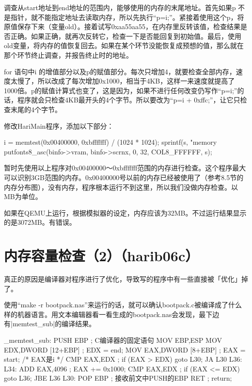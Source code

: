 调查从start地址到end地址的范围内，能够使用的内存的末尾地址。首先如果p 不是指针，就不能指定地址去读取内存，所以先执行“p=i;”。紧接着使用这个p，将原值保存下来（变量old）。接着试写0xaa55aa55，在内存里反转该值，检查结果是否正确。如果正确，就再次反转它，检查一下是否能回复到初始值。最后，使用old变量，将内存的值恢复回去。如果在某个环节没能恢复成预想的值，那么就在那个环节终止调查，并报告终止时的地址。

for 语句中i 的增值部分以及p的赋值部分。每次只增加4，就要检查全部内存，速度太慢了，所以改成了每次增加0x1000，相当于4KB，这样一来速度就提高了1000倍。p的赋值计算式也变了，这是因为，如果不进行任何改变仍写作“p=i;”的话，程序就会只检查4KB最开头的4个字节。所以要改为“p=i + 0xffc;”，让它只检查末尾的4个字节。


\cs

修改HariMain程序，添加以下部分：
\begin{code}[label=bootpack.c节选]
	i = memtest(0x00400000, 0xbfffffff) / (1024 * 1024);
	sprintf(s, "memory %
	putfonts8_asc(binfo->vram, binfo->scrnx, 0, 32, COL8_FFFFFF, s);
\end{code}

暂时先使用以上程序对0x00400000～0xbfffffff范围的内存进行检查。这个程序最大可以识别3GB范围的内存。0x00400000号以前的内存已经被使用了（参考8.5节的内存分布图），没有内存，程序根本运行不到这里，所以我们没做内存检查。以MB为单位。

如果在QEMU上运行，根据模拟器的设定，内存应该为32MB。不过运行结果显示的是3072MB。有错误。

\section{	内存容量检查（2）（harib06c）	}

真正的原因是编译器对程序进行了优化，导致写的程序中有一些直接被「优化」掉了。

使用“make -r bootpack.nas”来运行的话，就可以确认bootpack.c被编译成了什么样的机器语言。用文本编辑器看一看生成的bootpack.nas会发现，最下边有|memtest_sub|的编译结果。

\begin{code}[label=memtest\_sub的编译结果]
_memtest_sub:
    PUSH    EBP                 ; C编译器的固定语句
    MOV EBP,ESP
    MOV EDX,DWORD [12+EBP]      ; EDX = end;
    MOV EAX,DWORD [8+EBP]       ; EAX = start; /* EAX是i */
    CMP EAX,EDX                 ; if (EAX > EDX) goto L30;
    JA  L30
L36:
L34:
    ADD EAX,4096                ; EAX += 0x1000;
    CMP EAX,EDX                 ; if (EAX <= EDX) goto L36;
    JBE L36
L30:
    POP EBP                     ; 接收前文中PUSH的EBP
    RET                         ; return;
\end{code}

